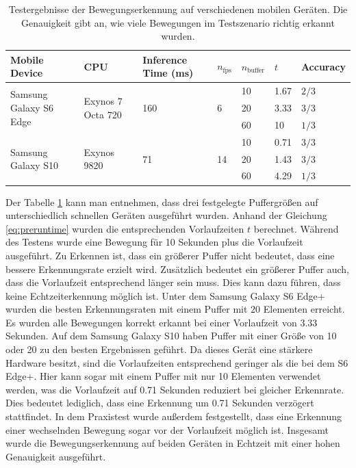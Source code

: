\begin{table}
    \footnotesize
    \begin{tabularx}{\textwidth}{l|l|X|l|l|l|l}
        \hline
        Mobile Device & CPU & Inference Time (ms) & $n_\mathrm{fps}$ & $n_\mathrm{buffer}$ & $t$ & Accuracy \\ \hline

        \multirow{3}{*}{Samsung Galaxy S6 Edge} & \multirow{3}{*}{Exynos 7 Octa 720} & \multirow{3}{*}{160} & \multirow{3}{*}{6} & 10 & 1.67 & $2 / 3$ \\ \cline{5-7}
        & & & & 20 & 3.33 & $3 / 3$ \\ \cline{5-7}
        & & & & 60 & 10 & $1 / 3$ \\ \hline

        \multirow{3}{*}{Samsung Galaxy S10} & \multirow{3}{*}{Exynos 9820} & \multirow{3}{*}{71} & \multirow{3}{*}{14} & 10 & 0.71 & $3/3$  \\ \cline{5-7}
        & & & & 20 & 1.43 & $3/3$ \\ \cline{5-7}
        & & & & 60 & 4.29 & $1/3$ \\ \hline
    \end{tabularx}
    \caption{Testergebnisse der Bewegungserkennung auf verschiedenen mobilen Geräten. Die Genauigkeit gibt an, wie viele Bewegungen im Testszenario richtig erkannt wurden.}
    \label{table:android-tests}
\end{table}

Der Tabelle \ref{table:android-tests} kann man entnehmen, dass drei festgelegte
Puffergrößen auf unterschiedlich schnellen Geräten ausgeführt wurden. Anhand
der Gleichung \ref{eq:preruntime} wurden die entsprechenden Vorlaufzeiten
$t$ berechnet. Während des Testens wurde eine Bewegung für 10 Sekunden plus die
Vorlaufzeit ausgeführt. Zu Erkennen ist, dass ein größerer Puffer nicht
bedeutet, dass eine bessere Erkennungsrate erzielt wird. Zusätzlich bedeutet
ein größerer Puffer auch, dass die Vorlaufzeit entsprechend länger sein muss.
Dies kann dazu führen, dass keine Echtzeiterkennung möglich ist. Unter dem
Samsung Galaxy S6 Edge+ wurden die besten Erkennungsraten mit einem Puffer mit
20 Elementen erreicht. Es wurden alle Bewegungen korrekt erkannt bei einer
Vorlaufzeit von 3.33 Sekunden. Auf dem Samsung Galaxy S10 haben Puffer mit
einer Größe von 10 oder 20 zu den besten Ergebnissen geführt. Da dieses Gerät
eine stärkere Hardware besitzt, sind die Vorlaufzeiten entsprechend geringer
als die bei dem S6 Edge+. Hier kann sogar mit einem Puffer mit nur 10 Elementen
verwendet werden, was die Vorlaufzeit auf 0.71 Sekunden reduziert bei gleicher
Erkennrate. Dies bedeutet lediglich, dass eine Erkennung um 0.71 Sekunden
verzögert stattfindet. In dem Praxistest wurde außerdem festgestellt, dass eine
Erkennung einer wechselnden Bewegung sogar vor der Vorlaufzeit möglich ist.
Insgesamt wurde die Bewegungserkennung auf beiden Geräten in Echtzeit mit einer
hohen Genauigkeit ausgeführt.
